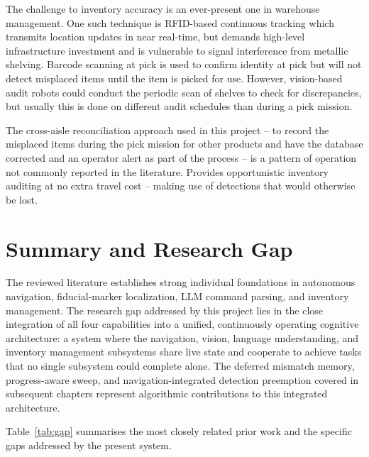 \documentclass[12pt,a4paper]{report}
\begin{document}
The challenge to inventory accuracy is an ever-present one in warehouse management. One such technique is RFID-based continuous tracking \citep{rfidjournal2020} which transmits location updates in near real-time, but demands high-level infrastructure investment and is vulnerable to signal interference from metallic shelving. Barcode scanning at pick is used to confirm identity at pick but will not detect misplaced items until the item is picked for use. However, vision-based audit robots \citep{bosch2022} could conduct the periodic scan of shelves to check for discrepancies, but usually this is done on different audit schedules than during a pick mission.

The cross-aisle reconciliation approach used in this project – to record the misplaced items during the pick mission for other products and have the database corrected and an operator alert as part of the process – is a pattern of operation not commonly reported in the literature. Provides opportunistic inventory auditing at no extra travel cost – making use of detections that would otherwise be lost.

\section{Summary and Research Gap}

The reviewed literature establishes strong individual foundations in autonomous navigation, fiducial-marker localization, LLM command parsing, and inventory management. The research gap addressed by this project lies in the close integration of all four capabilities into a unified, continuously operating cognitive architecture: a system where the navigation, vision, language understanding, and inventory management subsystems share live state and cooperate to achieve tasks that no single subsystem could complete alone. The deferred mismatch memory, progress-aware sweep, and navigation-integrated detection preemption covered in subsequent chapters represent algorithmic contributions to this integrated architecture.

Table~\ref{tab:gap} summarises the most closely related prior work and the specific gaps addressed by the present system.
\end{document}
